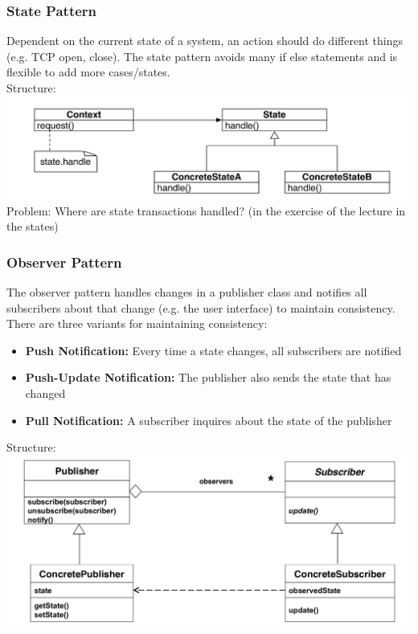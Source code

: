 \subsubsection{State Pattern}
Dependent on the current state of a system, an action should do different things (e.g. TCP open, close).
The state pattern avoids many if else statements and is flexible to add more cases/states.\\
Structure:\\
\includegraphics[width=\linewidth]{design_pattern/state.png}
Problem: Where are state transactions handled? (in the exercise of the lecture in the states)

\subsubsection{Observer Pattern}
The observer pattern handles changes in a publisher class and notifies all subscribers about that change (e.g. the user interface) to maintain consistency.
There are three variants for maintaining consistency:
\begin{itemize}
  \item \textbf{Push Notification:} Every time a state changes, all subscribers are notified
  \item \textbf{Push-Update Notification:} The publisher also sends the state that has changed
  \item \textbf{Pull Notification:} A subscriber inquires about the state of the publisher
\end{itemize}
Structure:\\
\includegraphics[width=\linewidth]{design_pattern/observer.png}

